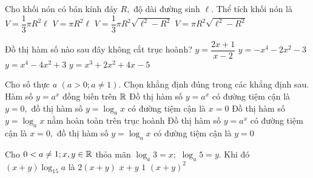 \begin{ex}%
Cho khối nón có bán kính đáy $  R, $ độ dài đường sinh $ \ell. $  Thể tích khối nón là
\choice
{$ V=\dfrac{1}{3}\pi R^2\ell $}
{$ V=\pi R^2\ell $}
{\True $ V=\dfrac{1}{3}\pi R^2\sqrt{\ell^2-R^2} $}
{$ V=\pi R^2\sqrt{\ell^2-R^2} $}
\end{ex}

\begin{ex}%
Đồ thị hàm số nào sau đây không cắt trục hoành?
\choice
{$ y=\dfrac{2x+1}{x-2} $}
{\True $ y=-x^4-2x^2-3 $}
{$ y=x^4-4x^2+3 $}
{$ y=x^3+2x^2+4x-5 $}
\end{ex}

\begin{ex}%
Cho số thực $ a $  $(a>0; a\neq 1).  $ Chọn khẳng định đúng trong các khẳng định sau.
\choice
{Hàm số $ y=a^x $ đồng biến trên $ \Bbb{R} $}
{\True Đồ thị hàm số $ y=a^x  $ có đường tiệm cận là $ y=0, $ đồ thị hàm số $ y=\log_a x $ có đường tiệm cận là $ x=0 $ }
{Đồ thị hàm số $ y=\log_a x  $ nằm hoàn toàn trên trục hoành}
{Đồ thị hàm số $ y=a^x  $ có đường tiệm cận là $ x=0, $ đồ thị hàm số $ y=\log_a x $ có đường tiệm cận là $ y=0 $ }
\end{ex}

\begin{ex}%
Cho $ 0<a\neq 1; x, y\in \Bbb{R} $ thỏa mãn $ \log_a 3=x; $ $ \log_a 5=y. $ Khi đó $ (x+y)\log_{15}a $ là
\choice
{$ 2(x+y) $}
{$ x+y $}
{\True $ 1 $}
{$ (x+y)^2 $}
\end{ex}

